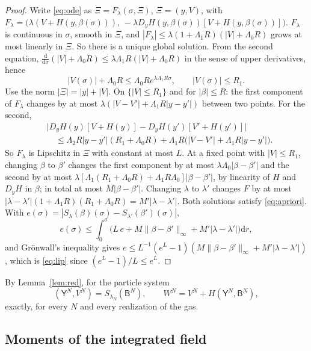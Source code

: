 \documentclass[11pt]{article}
\newcommand{\dd}{\mathrm{d}}
\newcommand{\sY}{\mathsf{Y}}
\newcommand{\sB}{\mathsf{B}}
\newcommand{\nrm}[1]{\|#1\|_\infty}
\theoremstyle{remark}
\begin{document}
\begin{proof}
Write \eqref{eq:ode} as $\dot\Xi=F_\lambda(\sigma,\Xi)$,
$\Xi=(y,V)$, with
$F_\lambda=\bigl(\lambda(V+H(y,\beta(\sigma))),\,
-\lambda D_yH(y,\beta(\sigma))[V+H(y,\beta(\sigma))]\bigr)$. $F_\lambda$
is continuous in $\sigma$, smooth in $\Xi$, and
$|F_\lambda|\le\lambda(1+\Lambda_1R)(|V|+\Lambda_0R)$ grows at most linearly
in $\Xi$. So there is a unique global solution. From the second equation,
$\frac{\dd}{\dd\sigma}(|V|+\Lambda_0R)\le\lambda\Lambda_1R(|V|+\Lambda_0R)$
in the sense of upper derivatives, hence
\begin{equation}
  |V(\sigma)|+\Lambda_0R\le\Lambda_0Re^{\lambda\Lambda_1R\sigma},\qquad
  |V(\sigma)|\le R_1 .
  \label{eq:apriori}
\end{equation}
Use the norm $|\Xi|=|y|+|V|$. On $\{|V|\le R_1\}$ and for $|\beta|\le R$:
the first component of $F_\lambda$ changes by at most
$\lambda(|V-V'|+\Lambda_1R|y-y'|)$ between two points. For the second,
\begin{align*}
  &\bigl|D_yH(y)[V+H(y)]-D_yH(y')[V'+H(y')]\bigr|\\
  &\quad\le\Lambda_2R|y-y'|(R_1+\Lambda_0R)
  +\Lambda_1R\bigl(|V-V'|+\Lambda_1R|y-y'|\bigr).
\end{align*}
So $F_\lambda$ is Lipschitz in $\Xi$ with constant at most $L$. At a fixed
point with $|V|\le R_1$, changing $\beta$ to $\beta'$ changes the first
component by at most $\lambda\Lambda_0|\beta-\beta'|$ and the second by at
most
$\lambda[\Lambda_1(R_1+\Lambda_0R)+\Lambda_1R\Lambda_0]|\beta-\beta'|$, by
linearity of $H$ and $D_yH$ in $\beta$; in total at most $M|\beta-\beta'|$.
Changing $\lambda$ to $\lambda'$ changes $F$ by at most
$|\lambda-\lambda'|(1+\Lambda_1R)(R_1+\Lambda_0R)=M'|\lambda-\lambda'|$.
Both solutions satisfy \eqref{eq:apriori}. With
$e(\sigma)=|S_\lambda(\beta)(\sigma)-S_{\lambda'}(\beta')(\sigma)|$,
\[
  e(\sigma)\le\int_0^\sigma\bigl(L\,e+M\nrm{\beta-\beta'}
  +M'|\lambda-\lambda'|\bigr)\dd r ,
\]
and Gr\"onwall's inequality gives
$e\le L^{-1}(e^L-1)(M\nrm{\beta-\beta'}+M'|\lambda-\lambda'|)$, which is
\eqref{eq:lip} since $(e^L-1)/L\le e^L$.
\end{proof}

By Lemma~\ref{lem:red}, for the particle system
\begin{equation}
  (\sY^N,V^N)=S_{\lambda_N}(\sB^N),\qquad
  W^N=V^N+H(\sY^N,\sB^N),
  \label{eq:repr}
\end{equation}
exactly, for every $N$ and every realization of the gas.

\subsection{Moments of the integrated field}
\end{document}
